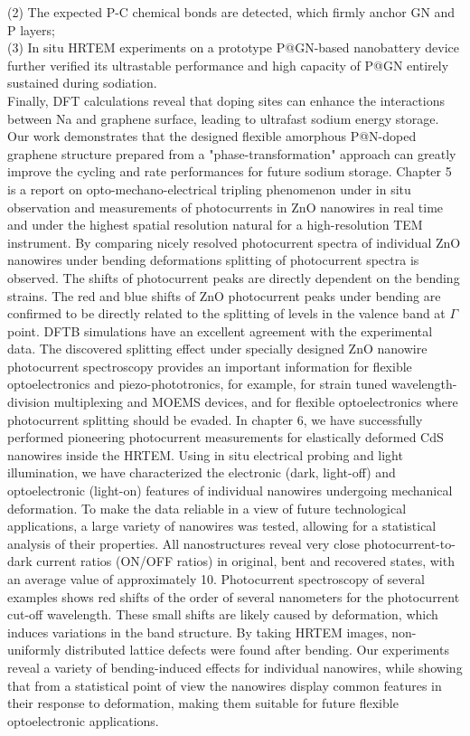(2) The expected P-C chemical bonds are detected, which firmly anchor GN and P layers; \\
(3) In situ HRTEM experiments on a prototype P@GN-based nanobattery device further verified its ultrastable performance and high capacity of P@GN entirely sustained during sodiation.\\
Finally, DFT calculations reveal that doping sites can enhance the interactions between Na and graphene surface, leading to ultrafast sodium energy storage. Our work demonstrates that the designed flexible amorphous P@N-doped graphene structure prepared from a "phase-transformation" approach can greatly improve the cycling and rate performances for future sodium storage. 
Chapter 5 is a report on opto-mechano-electrical tripling phenomenon under in situ observation and measurements of photocurrents in ZnO nanowires in real time and under the highest spatial resolution natural for a high-resolution TEM instrument. By comparing nicely resolved photocurrent spectra of individual ZnO nanowires under bending deformations splitting of photocurrent spectra is observed. The shifts of photocurrent peaks are directly dependent on the bending strains. The red and blue shifts of ZnO photocurrent peaks under bending are confirmed to be directly related to the splitting of levels in the valence band at $\Gamma$ point. DFTB simulations have an excellent agreement with the experimental data. The discovered splitting effect under specially designed ZnO nanowire photocurrent spectroscopy provides an important information for flexible optoelectronics and piezo-phototronics, for example, for strain tuned wavelength-division multiplexing and MOEMS devices, and for flexible optoelectronics where photocurrent splitting should be evaded. 
In chapter 6, we have successfully performed pioneering photocurrent measurements for elastically deformed CdS nanowires inside the HRTEM. Using in situ electrical probing and light illumination, we have characterized the electronic (dark, light-off) and optoelectronic (light-on) features of individual nanowires undergoing mechanical deformation. To make the data reliable in a view of future technological applications, a large variety of nanowires was tested, allowing for a statistical analysis of their properties. All nanostructures reveal very close photocurrent-to-dark current ratios (ON/OFF ratios) in original, bent and recovered states, with an average value of approximately 10. Photocurrent spectroscopy of several examples shows red shifts of the order of several nanometers for the photocurrent cut-off wavelength. These small shifts are likely caused by deformation, which induces variations in the band structure. By taking HRTEM images, non-uniformly distributed lattice defects were found after bending. Our experiments reveal a variety of bending-induced effects for individual nanowires, while showing that from a statistical point of view the nanowires display common features in their response to deformation, making them suitable for future flexible optoelectronic applications. 


